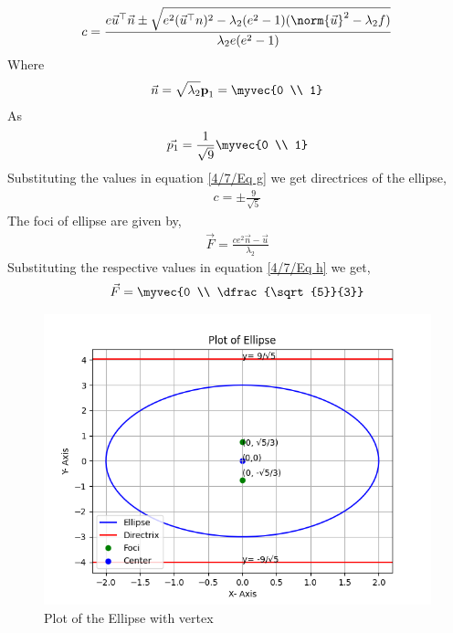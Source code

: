 \begin{align} \label{4/7/Eq g}
c = \frac{e \vec{u}^\top \vec{n} \pm \sqrt{e^2 (\vec{u}^\top n)^2 - \lambda_2 (e^2 - 1) (\norm{\vec{u}}^2 - \lambda_2 f)}}{\lambda_2 e (e^2 - 1)}
\end{align}
Where
\begin{align}
\vec{n} = \sqrt{\lambda_2} \textbf p_1 = \myvec{0 \\ 1}
\end{align}
As
\begin{align}
 \vec{p_1} = \frac{1}{\sqrt{9}} \myvec{0 \\ 1}
\end{align}
Substituting the values in equation \eqref{4/7/Eq g} we get directrices of the ellipse,
\begin{align}
c = \pm \frac{9}{\sqrt{5}}
\end{align}
The foci of ellipse are given by,
\begin{align} \label{4/7/Eq h}
\vec{F} = \frac{c e^2 \vec{n} - \vec{u}}{\lambda_2}
\end{align}
Substituting the respective values in equation \eqref{4/7/Eq h} we get,
\begin{align}
\vec{F}=\myvec{0 \\ \dfrac{\sqrt{5}}{3}}
\end{align}
\centering
\begin{figure}[!ht]
\centering
\includegraphics[width=\columnwidth]{solutions/4/7/Figure_1.png}
\caption{Plot of the Ellipse with vertex }
\label{4/7/fig}
\end{figure}